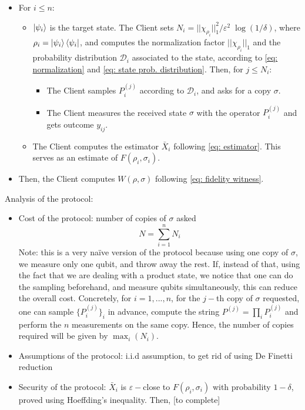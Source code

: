 \documentclass[a4paper,unpublished,onecolumn,11pt]{quantumarticle}
\begin{document}
\begin{itemize}
    \item For $i\leq n$:
        \begin{itemize}
            \item $\ket{\psi_i}$ is the target state. The Client sets $N_i = ||\chi_{\rho_i}||_1^2 /\varepsilon^2 \; \log(1/\delta)$, where $\rho_i=\ket{\psi_i}\bra{\psi_i}$, and computes the normalization factor $||\chi_{\rho_i}||_1$ and the probability distribution $\mathcal D_i$ associated to the state, according to \ref{eq: normalization} and \ref{eq: state prob. distribution}. Then, for $j\leq N_i$:
            \begin{itemize}
                \item The Client samples $P_{i}^{(j)}$ according to $\mathcal D_i$, and asks for a copy $\sigma$.
                \item The Client measures the received state $\sigma$ with the operator $P_i^{(j)}$ and gets outcome $y_{ij}$.
            \end{itemize}
            \item The Client computes the estimator $\bar X_i$ following \ref{eq: estimator}. This serves as an estimate of $F(\rho_i, \sigma_i)$.
        \end{itemize}
    \item Then, the Client computes $W(\rho, \sigma)$ following \ref{eq: fidelity witness}.
\end{itemize}

Analysis of the protocol:
\begin{itemize}
    \item Cost of the protocol: number of copies of $\sigma$ asked
    \begin{equation}
        N = \sum_{i=1}^n N_i
    \end{equation}
    Note: this is a very naïve version of the protocol because using one copy of $\sigma$, we measure only one qubit, and throw away the rest. If, instead of that, using the fact that we are dealing with a product state, we notice that one can do the sampling beforehand, and measure qubits simultaneously, this can reduce the overall cost. Concretely, for $i=1, ..., n$, for the $j-$th copy of $\sigma$ requested, one can sample $\{P_{i}^{(j)}\}_i$ in advance, compute the string $P^{(j)} = \prod_i P_i^{(j)}$ and perform the $n$ measurements on the same copy. Hence, the number of copies required will be given by $\max_i(N_i)$.
    
    \item Assumptions of the protocol: i.i.d assumption, to get rid of using De Finetti reduction
    \item Security of the protocol: $\bar X_i$ is $\varepsilon-$close to $F(\rho_i, \sigma_i)$ with probability $1-\delta$, proved using Hoeffding's inequality. Then, [to complete]
\end{itemize}
\end{document}

